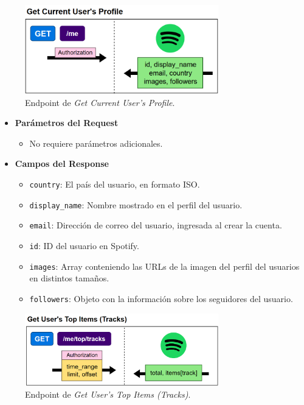 \begin{figure}[H]
    \centering
    \includegraphics[width=0.75\textwidth]{figures/endpoints/get_current_users_profile.png}
    \caption{Endpoint de \textit{Get Current User's Profile}.}
    \label{fig:get_current_usr_profile}
\end{figure}

\begin{itemize}
    \item \textbf{Parámetros del Request}
          \begin{itemize}
              \item No requiere parámetros adicionales.
          \end{itemize}
    \item \textbf{Campos del Response}
          \begin{itemize}
              \item \texttt{country}: El país del usuario, en formato ISO.
              \item \texttt{display\_name}: Nombre mostrado en el perfil del usuario.
              \item \texttt{email}: Dirección de correo del usuario, ingresada al crear la cuenta.
              \item \texttt{id}: ID del usuario en Spotify.
              \item \texttt{images}: Array conteniendo las URLs de la imagen del perfil del usuarios en distintos tamaños.
              \item \texttt{followers}: Objeto con la información sobre los seguidores del usuario.
          \end{itemize}
\end{itemize}


\begin{figure}[H]
    \centering
    \includegraphics[width=0.75\textwidth]{figures/endpoints/get_users_top_items_tracks.png}
    \caption{Endpoint de \textit{Get User's Top Items (Tracks)}.}
    \label{fig:get_usr_top_items_tracks}
\end{figure}

